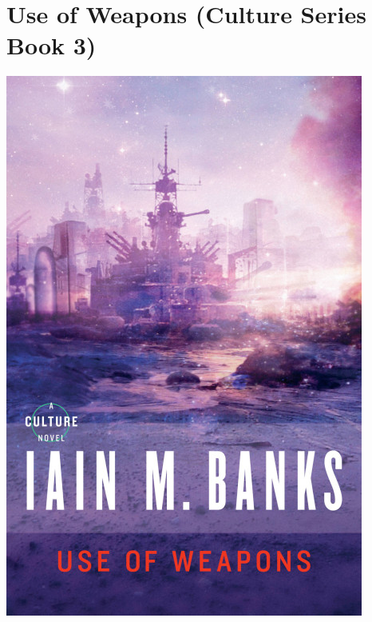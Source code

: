 \documentclass{tufte-handout}
\makeatletter
\newcommand{\varcaption}[2][0pt]{%
  \gsetlength{\@tufte@caption@vertical@offset}{-#1}%
  \gdef\@tufte@stored@varcaption{#2}%
}
\gdef\@tufte@stored@varcaption{} %
\makeatother
\begin{document}
\section*{Use of Weapons (Culture Series Book 3)}
\begin{marginfigure}[\baselineskip]
   \includegraphics[width=\linewidth]{images/use_of_weapons.jpg}
   \varcaption{\href{https://www.hachettebookgroup.com/titles/iain-m-banks/use-of-weapons/9780316030571/}{Publisher Link}, \href{https://www.amazon.com/Use-Weapons-Culture-Iain-Banks/dp/0316030570/}{Amazon Link}}
\end{marginfigure}
\end{document}
